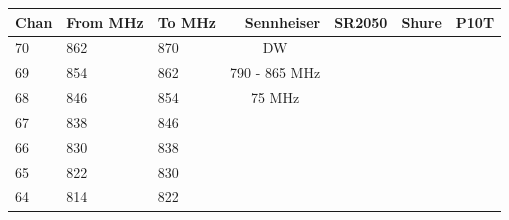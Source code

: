             \begin{longtable}[H]{|p{1cm}|p{1cm}|p{1cm}|cc|cc|}
                \hline
                \textbf{Chan} &
                  \textbf{From MHz} &
                  \textbf{To MHz} &
                  \multicolumn{1}{r}{\textbf{Sennheiser}} &
                  \multicolumn{1}{l|}{\textbf{SR2050}} &
                  \multicolumn{1}{r}{\textbf{Shure}} &
                  \multicolumn{1}{l|}{\textbf{P10T}} \\ \hline
                \endfirsthead
                \endhead
                70 &
                  862 &
                  870 &
                  \multicolumn{1}{c|}{\cellcolor[HTML]{34FF34}DW} &
                   &
                   &
                   \\ \cline{1-3}
                \cellcolor[HTML]{FFCCC9}69 &
                  \cellcolor[HTML]{FFCCC9}854 &
                  \cellcolor[HTML]{FFCCC9}862 &
                  \multicolumn{1}{c|}{\cellcolor[HTML]{34FF34}790 - 865 MHz} &
                   &
                   &
                   \\ \cline{1-3}
                \cellcolor[HTML]{FFCCC9}68 &
                  \cellcolor[HTML]{FFCCC9}846 &
                  \cellcolor[HTML]{FFCCC9}854 &
                  \multicolumn{1}{c|}{\cellcolor[HTML]{34FF34}75 MHz} &
                   &
                   &
                   \\ \cline{1-3}
                \cellcolor[HTML]{FFCCC9}67 &
                  \cellcolor[HTML]{FFCCC9}838 &
                  \cellcolor[HTML]{FFCCC9}846 &
                  \multicolumn{1}{c|}{\cellcolor[HTML]{34FF34}} &
                   &
                   &
                   \\ \cline{1-3}
                \cellcolor[HTML]{FFCCC9}66 &
                  \cellcolor[HTML]{FFCCC9}830 &
                  \cellcolor[HTML]{FFCCC9}838 &
                  \multicolumn{1}{c|}{\cellcolor[HTML]{34FF34}} &
                   &
                   &
                   \\ \cline{1-3}
                \cellcolor[HTML]{FFCCC9}65 &
                  \cellcolor[HTML]{FFCCC9}822 &
                  \cellcolor[HTML]{FFCCC9}830 &
                  \multicolumn{1}{c|}{\cellcolor[HTML]{34FF34}} &
                   &
                   &
                   \\ \cline{1-3}
                \cellcolor[HTML]{FFCCC9}64 &
                  \cellcolor[HTML]{FFCCC9}814 &
                  \cellcolor[HTML]{FFCCC9}822 &

\end{longtable}
